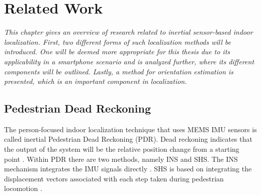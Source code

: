 

\chapter{Related Work}
\label{chap:related work}
\textit{This chapter gives an overview of research related to inertial  sensor-based indoor localization. First, two different forms of such localization methods will be introduced. One will be deemed more appropriate for this thesis due to its applicability in a smartphone scenario and is analyzed further, where its different components will be outlined. Lastly, a method for orientation estimation is presented, which is an important component in localization. }


\section{Pedestrian Dead Reckoning}
\label{sec:relevant_research}
The person-focused indoor localization technique that uses \ac{MEMS} \ac{IMU} sensors is called inertial Pedestrian Dead Reckoning (PDR). Dead reckoning indicates that the output of the system will be the relative position change from a starting point \cite{Yu2018}. Within PDR there are two methods, namely \ac{INS} and \ac{SHS}. The INS mechanism integrates the \ac{IMU} signals directly \cite{Diez2018b}. \ac{SHS} is based on integrating the displacement vectors associated with each step taken during pedestrian locomotion \cite{Davidson2017}.  \par

